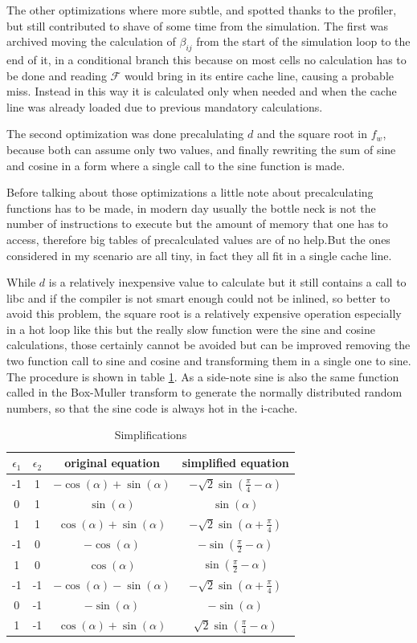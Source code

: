 \documentclass[Lau]{sapthesis} %
\begin{document}
The other optimizations where more subtle, and spotted thanks to the profiler,
but still contributed to shave of some time from the simulation. The first was
archived moving the calculation of $\beta_{ij}$ from the start of the simulation
loop to the end of it, in a conditional branch this because on most cells no
calculation has to be done and reading $\mathcal{F}$ would bring in its entire
cache line, causing a probable miss. Instead in this way it is calculated only
when needed and when the cache line was already loaded due to previous mandatory
calculations.

The second optimization was done precalulating $d$ and the square root in $f_w$,
because both can assume only two values, and finally rewriting the sum of sine
and cosine in a form where a single call to the sine function is made.

Before talking about those optimizations a little note about precalculating
functions has to be made, in modern day usually the bottle neck is not the
number of instructions to execute but the amount of memory that one has to
access, therefore big tables of precalculated values are of no help.But the
ones considered in my scenario are all tiny, in fact they all fit in a single
cache line.

While $d$ is a relatively inexpensive value to calculate but it still contains a
call to libc and if the compiler is not smart enough could not be inlined, so
better to avoid this problem, the square root is a relatively expensive
operation especially in a hot loop like this but the really slow function were
the sine and cosine calculations, those certainly cannot be avoided but can be
improved removing the two function call to sine and cosine and transforming them
in a single one to sine. The procedure is shown in table
\ref{tab:simplifications}. As a side-note sine is also the same function called
in the Box-Muller transform to generate the normally distributed random numbers,
so that the sine code is always hot in the i-cache.

\begin{table}
\centering
\begin{tabular}{c c | c | c}
$\epsilon_1$ & $\epsilon_2$ & original equation & simplified equation\\
\hline
-1 & 1 & $-\cos(\alpha)+\sin(\alpha)$ & $-\sqrt{2}\sin(\frac{\pi}{4}-\alpha)$\\
0 & 1 & $\sin(\alpha)$ & $\sin(\alpha)$\\
1 & 1 & $\cos(\alpha) + \sin(\alpha)$ & $-\sqrt{2}\sin(\alpha+\frac{\pi}{4})$\\
-1 & 0 & $-\cos(\alpha)$ & $-\sin(\frac{\pi}{2}-\alpha)$\\
1 & 0 & $\cos(\alpha)$ & $\sin(\frac{\pi}{2}-\alpha)$\\
-1 & -1 & $-\cos(\alpha)-\sin(\alpha)$ & $-\sqrt{2}\sin(\alpha+\frac{\pi}{4})$\\
0 & -1 & $-\sin(\alpha)$ & $-\sin(\alpha)$\\
1 & -1 & $\cos(\alpha) + \sin(\alpha)$ & $\sqrt{2}\sin(\frac{\pi}{4}-\alpha)$\\
\end{tabular}
\caption{Simplifications}
\label{tab:simplifications}
\end{table}
\end{document}
